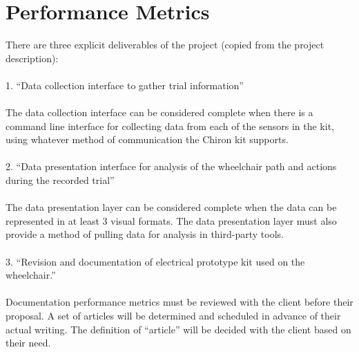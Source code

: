 \documentclass[onecolumn, draftclsnofoot,10pt, compsoc]{IEEEtran}
\begin{document}
\section{Performance Metrics}
	There are three explicit deliverables of the project (copied from the project description): 
\\
\\1. “Data collection interface to gather trial information”
\\
\\The data collection interface can be considered complete when there is a command line interface for collecting data from each of the sensors in the kit, using whatever method of communication the Chiron kit supports. 
\\
\\
2. “Data presentation interface for analysis of the wheelchair path and actions during the recorded trial”
\\
\\The data presentation layer can be considered complete when the data can be represented in at least 3 visual formats. The data presentation layer must also provide a method of pulling data for analysis in third-party tools.\\
\\
3. “Revision and documentation of electrical prototype kit used on the wheelchair.”
\\
\\Documentation performance metrics must be reviewed with the client before their proposal. A set of articles will be determined and scheduled in advance of their actual writing. The definition of “article” will be decided with the client based on their need. 
\end{document}

